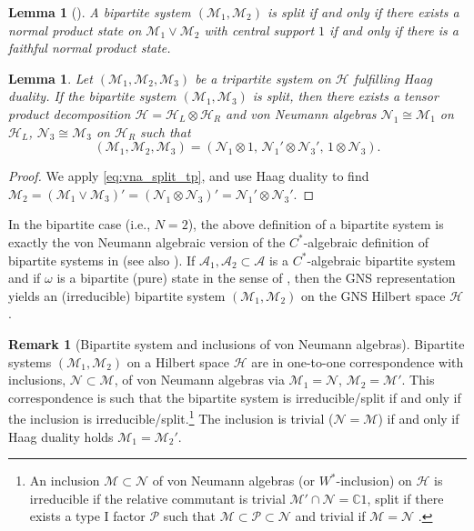 \documentclass[a4paper, 10pt, onecolumn, accepted=2025-07-22]{quantumarticle}
\newtheorem{lemma}[theorem]{Lemma}
\theoremstyle{definition}
\newtheorem{remark}[theorem]{Remark}
\newcommand{\ox}{\otimes}
\newcommand{\mc}{\mathcal}
\def\A{{\mc A}}
\def\CC{{\mathbb C}}
\def\H{{\mc H}}
\def\M{{\mc M}}
\def\N{{\mc N}}
\renewcommand\P{\mc P}
\newcommand*{\1}{\text{\usefont{U}{bbold}{m}{n}1}}
\begin{document}
\begin{lemma}[{\cite[Remark]{dantoni_interpolation_1983}}]\label{lem:product-state}
    A bipartite system $(\M_1,\M_2)$ is split if and only if there exists a normal product state on $\M_1\vee \M_2$ with central support $1$ if and only if there is a faithful normal product state. 
\end{lemma}

\begin{lemma}\label{lem:split}
    Let $(\M_1,\M_2,\M_3)$ be a tripartite system on $\H$ fulfilling Haag duality.
    If the bipartite system $(\M_1,\M_3)$ is split, then there exists a tensor product decomposition $\H = \H_L\ox \H_R$ and von Neumann algebras $\N_1\cong \M_1$ on $\H_L$, $\N_3\cong \M_3$ on $\H_R$ such that 
    \begin{equation}
        (\M_1,\M_2,\M_3) = (\N_1\ox 1,\,\N_1'\ox \N_3',\, 1\ox \N_3).
    \end{equation}
\end{lemma}
\begin{proof}
     We apply \eqref{eq:vna_split_tp}, and use Haag duality to find $\M_2 = (\M_1\vee \M_3)' = (\N_1\ox \N_3)' = \N_1' \ox \N_3'$.
\end{proof}

In the bipartite case (i.e., $N=2$), the above definition of a bipartite system is exactly the von Neumann algebraic version of the $C^*$-algebraic definition of bipartite systems in \cite{van_luijk_schmidt_2023} (see also \cite{summers1990on_independence}).
If $\A_1,\A_2\subset \A$ is a $C^*$-algebraic bipartite system and if $\omega$ is a bipartite (pure) state in the sense of \cite{van_luijk_schmidt_2023}, then the GNS representation yields an (irreducible) bipartite system $(\M_1,\M_2)$ on the GNS Hilbert space $\H$ \cite[Prop.~16]{van_luijk_schmidt_2023}.



\begin{remark}[Bipartite system and inclusions of von Neumann algebras]
    Bipartite systems $(\M_1,\allowbreak \M_2)$ on a Hilbert space $\H$ are in one-to-one correspondence with inclusions, $\N\subset \M$, of von Neumann algebras via $\M_1 =\N$, $\M_2=\M'$.
    This correspondence is such that the bipartite system is irreducible/split if and only if the inclusion is irreducible/split.\footnote{An inclusion $\M\subset\N$ of von Neumann algebras (or $W^*$-inclusion) on $\H$ is irreducible if the relative commutant is trivial $\M'\cap \N=\CC1$, split if there exists a type I factor $\P$ such that $\M\subset\P\subset \N$ and trivial if $\M=\N$ \cite{doplicher1984split}.}
    The inclusion is trivial ($\N=\M$) if and only if Haag duality holds $\M_1=\M_2'$.
\end{remark}
\end{document}
